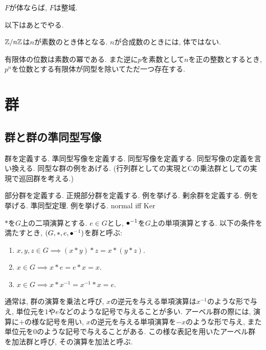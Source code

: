 \begin{prop}
  $F$が体ならば, $F$は整域.
\end{prop}


以下はあとでやる.
\begin{prop}
  $\mathbb{Z}/n\mathbb{Z}$は$n$が素数のとき体となる.
  $n$が合成数のときには, 体ではない.
\end{prop}

\begin{prop}
  有限体の位数は素数の冪である.
  また逆に$p$を素数として$n$を正の整数とするとき,
  $p^n$を位数とする有限体が同型を除いてただ一つ存在する.
\end{prop}

\chapter{群}
\section{群と群の準同型写像}
 群を定義する.
 準同型写像を定義する.
 同型写像を定義する.
 同型写像の定義を言い換える.
 同型な群の例をあげる.
 (行列群としての実現とCの乗法群としての実現で巡回群を考える.)
 
 部分群を定義する.
 正規部分群を定義する.
 例を挙げる.
 剰余群を定義する.
 例を挙げる.
 準同型定理.
 例を挙げる.
 normal iff Ker

\begin{definition}[再掲]
  $\ast$を$G$上の二項演算とする.
  $e\in G$とし,
  ${\bullet}^{-1}$を$G$上の単項演算とする.
  以下の条件を満たすとき,
  $(G,\ast,e,{\bullet}^{-1})$を群と呼ぶ:
  \begin{enumerate}
  \item $x,y,z\in G\implies (x\ast y) \ast z = x\ast (y\ast z)$.
  \item $x\in G\implies x\ast e=e\ast x =x$.
  \item $x\in G \implies x\ast x^{-1}=x^{-1}\ast x =e$.
  \end{enumerate}
\end{definition}
\begin{remark}
  通常は,
  群の演算を乗法と呼び,
  $x$の逆元を与える単項演算は$x^{-1}$のような形で与え,
  単位元を$1$や$e$などのような記号で与えることが多い.
  アーベル群の際には,
  演算に$+$の様な記号を用い,
  $x$の逆元を与える単項演算を$-x$のような形で与え,
  また単位元を$0$のような記号で与えることがある.
  この様な表記を用いたアーベル群を加法群と呼び,
  その演算を加法と呼ぶ.
\end{remark}

